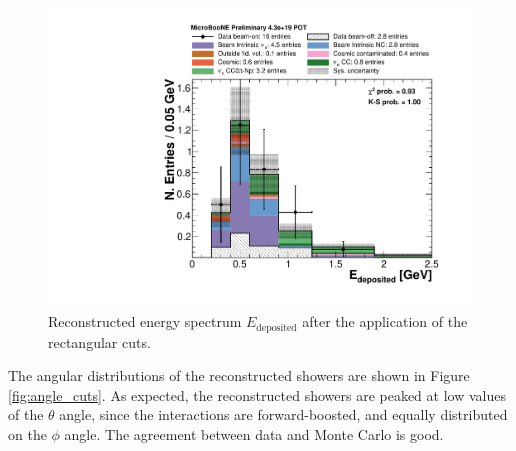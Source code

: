 \begin{figure}[htbp]
\centering
  \includegraphics[width=0.75\linewidth]{figures/h_reco_energy_cuts.pdf}
  \caption{Reconstructed energy spectrum $E_{\mathrm{deposited}}$ after the application of the rectangular cuts.}\label{fig:reco_cuts}
\end{figure}

The angular distributions of the reconstructed showers are shown in Figure \ref{fig:angle_cuts}. As expected, the reconstructed showers are peaked at low values of the $\theta$ angle, since the interactions are forward-boosted, and equally distributed on the $\phi$ angle. The agreement between data and Monte Carlo is good.

